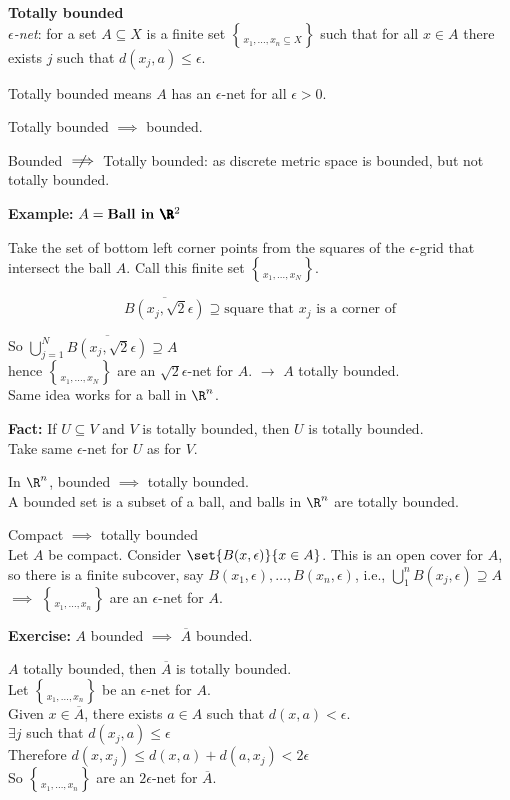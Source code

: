 \textbf{Totally bounded} \\
\emph{$\epsilon$-net}: for a set $A\subseteq X$ is a finite set $\brace{x_1,\dotsc,x_n}\subseteq X$ such that for all $x\in A$ there exists $j$ such that $d(x_j,a)\leq\epsilon$.

Totally bounded means $A$ has an $\epsilon$-net for all $\epsilon>0$.

Totally bounded $\implies$ bounded.

Bounded $\centernot\implies$ Totally bounded: as discrete metric space is bounded, but not totally bounded.

\textbf{Example:} $A=\textbf{Ball in $\pmb\R^2$}$

Take the set of bottom left corner points from the squares of the $\epsilon$-grid that intersect the ball $A$.  Call this finite set $\brace{x_1,\dotsc,x_N}$.

\[ \overline{B(x_j,\sqrt2\epsilon)} \supseteq \text{square that $x_j$ is a corner of} \]

So $\bigcup_{j=1}^N \overline{B(x_j,\sqrt2\epsilon)} \supseteq A$ \\
hence $\brace{x_1,\dotsc,x_N}$ are an $\sqrt2\epsilon$-net for $A$. $\to$ $A$ totally bounded. \\
Same idea works for a ball in $\R^n$.

\textbf{Fact:} If $U\subseteq V$ and $V$ is totally bounded, then $U$ is totally bounded. \\
\pf Take same $\epsilon$-net for $U$ as for $V$.

\prop In $\R^n$, bounded $\implies$ totally bounded. \\
\pf A bounded set is a subset of a ball, and balls in $\R^n$ are totally bounded.

\prop Compact $\implies$ totally bounded \\
\pf Let $A$ be compact.  Consider $\set{B(x,\epsilon)}{x\in A}$.  This is an open cover for $A$, so there is a finite subcover, say $B(x_1,\epsilon),\dotsc,B(x_n,\epsilon)$, i.e., $\bigcup_{1}^n B(x_j,\epsilon)\supseteq A$ \\
$\implies$ $\brace{x_1,\dotsc,x_n}$ are an $\epsilon$-net for $A$.

\textbf{Exercise:} $A$ bounded $\implies$ $\overline A$ bounded.

\prop $A$ totally bounded, then $\overline A$ is totally bounded. \\
\pf Let $\brace{x_1,\dotsc,x_n}$ be an $\epsilon$-net for $A$. \\
Given $x\in\overline A$, there exists $a\in A$ such that $d(x,a)<\epsilon$. \\
$\exists j$ such that $d(x_j,a)\leq\epsilon$ \\
Therefore $d(x,x_j)\leq d(x,a)+d(a,x_j)<2\epsilon$ \\
So $\brace{x_1,\dotsc,x_n}$ are an $2\epsilon$-net for $\overline A$.

